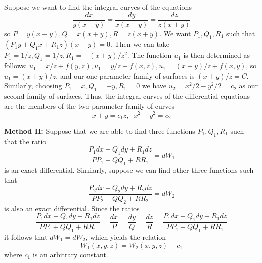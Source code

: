 \documentclass[12pt, a4paper, oneside, openright, titlepage]{book}
\begin{document}
\begin{appendices}
    \begin{eg}
        Suppose we want to find the integral curves of the equations \begin{equation*}
            \frac{dx}{y(x+y)} = \frac{dy}{x(x+y)} = \frac{dz}{z(x+y)}
        \end{equation*}
        so $P = y(x+y),Q = x(x+y),R = z(x+y)$. We want $P_1,Q_1,R_1$ such that $(P_1y+Q_1x+R_1z)(x+y) = 0$. Then we can take $P_1 = 1/z, Q_1 = 1/z, R_1 = -(x+y)/z^2$. The function $u_1$ is then determined as follows: $u_1 = x/z+f(y,z),u_1 = y/z+f(x,z), u_1 = (x+y)/z+f(x,y)$, so $u_1 = (x+y)/z$, and our one-parameter family of surfaces is $(x+y)/z = C$. Similarly, choosing $P_1 = x,Q_1 = -y, R_1 = 0$ we have $u_2 = x^2/2-y^2/2 = c_2$ as our second family of surfaces. Thus, the integral curves of the differential equations are the members of the two-parameter family of curves\begin{equation*}
            x+y = c_1z, \;\;x^2-y^2 = c_2
        \end{equation*}
    \end{eg}

    \textbf{Method II:} Suppose that we are able to find three functions $P_1,Q_1,R_1$ such that the ratio \begin{equation*}
        \frac{P_1dx+Q_1dy+R_1dz}{PP_1+QQ_1+RR_1} = dW_1
    \end{equation*}
    is an exact differential. Similarly, suppose we can find other three functions such that \begin{equation*}
        \frac{P_2dx+Q_2dy+R_2dz}{PP_2+QQ_2+RR_2} = dW_2
    \end{equation*}
    is also an exact differential. Since the ratios \begin{equation*}
        \frac{P_1dx+Q_1dy+R_1dz}{PP_1+QQ_1+RR_1} = \frac{dx}{P}=\frac{dy}{Q} =\frac{dz}{R} = \frac{P_1dx+Q_1dy+R_1dz}{PP_1+QQ_1+RR_1}
    \end{equation*}
    it follows that $dW_1 = dW_2$, which yields the relation \begin{equation*}
        W_1(x,y,z) = W_2(x,y,z) +c_1
    \end{equation*}
    where $c_1$ is an arbitrary constant.


\end{appendices}
\end{document}
